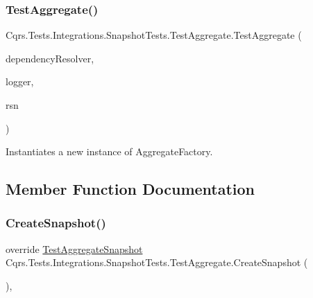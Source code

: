 \subsubsection{\texorpdfstring{Test\+Aggregate()}{TestAggregate()}}
{\footnotesize\ttfamily Cqrs.\+Tests.\+Integrations.\+Snapshot\+Tests.\+Test\+Aggregate.\+Test\+Aggregate (\begin{DoxyParamCaption}\item[{\hyperlink{interfaceCqrs_1_1Configuration_1_1IDependencyResolver}{I\+Dependency\+Resolver}}]{dependency\+Resolver,  }\item[{I\+Logger}]{logger,  }\item[{Guid}]{rsn }\end{DoxyParamCaption})}



Instantiates a new instance of Aggregate\+Factory. 



\subsection{Member Function Documentation}
\mbox{\label{classCqrs_1_1Tests_1_1Integrations_1_1SnapshotTests_1_1TestAggregate_a3857c57a4e603c8d53103caf5f3275d3_a3857c57a4e603c8d53103caf5f3275d3}} 
\subsubsection{\texorpdfstring{Create\+Snapshot()}{CreateSnapshot()}}
{\footnotesize\ttfamily override \hyperlink{classCqrs_1_1Tests_1_1Integrations_1_1SnapshotTests_1_1TestAggregateSnapshot}{Test\+Aggregate\+Snapshot} Cqrs.\+Tests.\+Integrations.\+Snapshot\+Tests.\+Test\+Aggregate.\+Create\+Snapshot (\begin{DoxyParamCaption}{ }\end{DoxyParamCaption})\hspace{0.3cm}{\ttfamily [protected]}, {\ttfamily [virtual]}}



